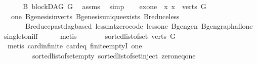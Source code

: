 \begin{isabellebody}
%
\isadelimproof
%
\endisadelimproof
%
\isatagproof
{}\isamarkupfalse%
\ {\isacharminus}{\kern0pt}\isanewline
\ \ \isamarkupfalse%
\ B{\isacharcolon}{\kern0pt}\ blockDAG\ {\isachardoublequoteopen}G{\isachardoublequoteclose}\ \isamarkupfalse%
\ assms{\isacharparenleft}{\kern0pt}{}{\isacharparenright}{\kern0pt}\ \isamarkupfalse%
\ simp\isanewline
\ \ \isamarkupfalse%
\ exone{\isacharcolon}{\kern0pt}\ {\isachardoublequoteopen}{\isasymexists}{\isacharbang}{\kern0pt}\ x{\isachardot}{\kern0pt}\ x\ {\isasymin}\ {\isacharparenleft}{\kern0pt}verts\ G{\isacharparenright}{\kern0pt}{\isachardoublequoteclose}\isanewline
\ \ \ \ \isamarkupfalse%
\ \ one\ B{\isachardot}{\kern0pt}genesis{\isacharunderscore}{\kern0pt}in{\isacharunderscore}{\kern0pt}verts\ B{\isachardot}{\kern0pt}genesis{\isacharunderscore}{\kern0pt}unique{\isacharunderscore}{\kern0pt}exists\ B{\isachardot}{\kern0pt}reduce{\isacharunderscore}{\kern0pt}less\isanewline
\ \ \ \ \ \ B{\isachardot}{\kern0pt}reduce{\isacharunderscore}{\kern0pt}past{\isacharunderscore}{\kern0pt}dagbased\ less{\isacharunderscore}{\kern0pt}nat{\isacharunderscore}{\kern0pt}zero{\isacharunderscore}{\kern0pt}code\ less{\isacharunderscore}{\kern0pt}one\ B{\isachardot}{\kern0pt}gen{\isacharunderscore}{\kern0pt}gen\ B{\isachardot}{\kern0pt}gen{\isacharunderscore}{\kern0pt}graph{\isacharunderscore}{\kern0pt}all{\isacharunderscore}{\kern0pt}one\ singleton{\isacharunderscore}{\kern0pt}iff\isanewline
\ \ \ \ \isamarkupfalse%
\ {\isacharparenleft}{\kern0pt}metis{\isacharparenright}{\kern0pt}\ \ \isanewline
\ \ \isamarkupfalse%
\ \isamarkupfalse%
\ {\isachardoublequoteopen}sorted{\isacharunderscore}{\kern0pt}list{\isacharunderscore}{\kern0pt}of{\isacharunderscore}{\kern0pt}set\ {\isacharparenleft}{\kern0pt}verts\ G{\isacharparenright}{\kern0pt}\ {\isasymnoteq}\ {\isacharbrackleft}{\kern0pt}{\isacharbrackright}{\kern0pt}{\isachardoublequoteclose}\isanewline
\ \ \ \ \isamarkupfalse%
\ {\isacharparenleft}{\kern0pt}metis\ card{\isachardot}{\kern0pt}infinite\ card{\isacharunderscore}{\kern0pt}{}{\isacharunderscore}{\kern0pt}eq\ finite{\isachardot}{\kern0pt}emptyI\ one\ \isanewline
\ \ \ \ \ \ \ \ sorted{\isacharunderscore}{\kern0pt}list{\isacharunderscore}{\kern0pt}of{\isacharunderscore}{\kern0pt}set{\isacharunderscore}{\kern0pt}empty\ sorted{\isacharunderscore}{\kern0pt}list{\isacharunderscore}{\kern0pt}of{\isacharunderscore}{\kern0pt}set{\isacharunderscore}{\kern0pt}inject\ zero{\isacharunderscore}{\kern0pt}neq{\isacharunderscore}{\kern0pt}one{\isacharparenright}{\kern0pt}\ \isanewline

\end{isabellebody}
